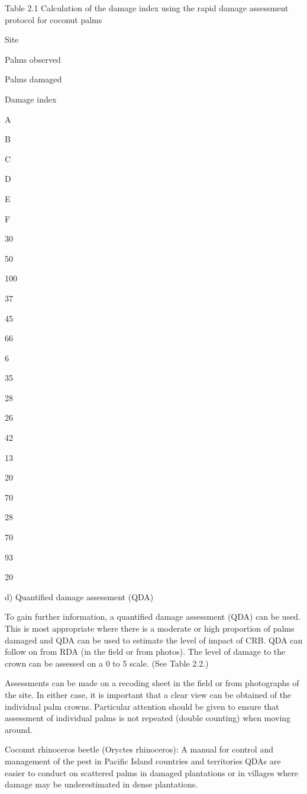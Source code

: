 \documentclass[twocolumn,letterpaper]{scrartcl}
\begin{document}
Table 2.1 Calculation of the damage index using the rapid damage assessment protocol for coconut palms

Site

Palms observed

Palms damaged

Damage index

A

B

C

D

E

F

30

50

100

37

45

66

6

35

28

26

42

13

20

70

28

70

93

20

d)  Quantified damage assessment (QDA) 

To  gain  further  information,  a  quantified  damage  assessment  (QDA)  can  be  used.  This  is  most  appropriate 
where there is a moderate or high proportion of palms damaged and QDA can be used to estimate the level of 
impact of CRB. QDA can follow on from RDA (in the field or from photos). The level of damage to the crown can 
be assessed on a 0 to 5 scale. (See Table 2.2.) 

Assessments can be made on a recoding sheet in the field or from photographs of the site. In either case, it 
is important that a clear view can be obtained of the individual palm crowns. Particular attention should be 
given to ensure that assessment of individual palms is not repeated (double counting) when moving around. 

Coconut rhinoceros beetle (Oryctes rhinoceros): A manual for control and management of the pest in Pacific Island countries and territoriesQDAs are easier to conduct on scattered palms in damaged plantations or in villages where damage may be 
underestimated in dense plantations. 
\end{document}
